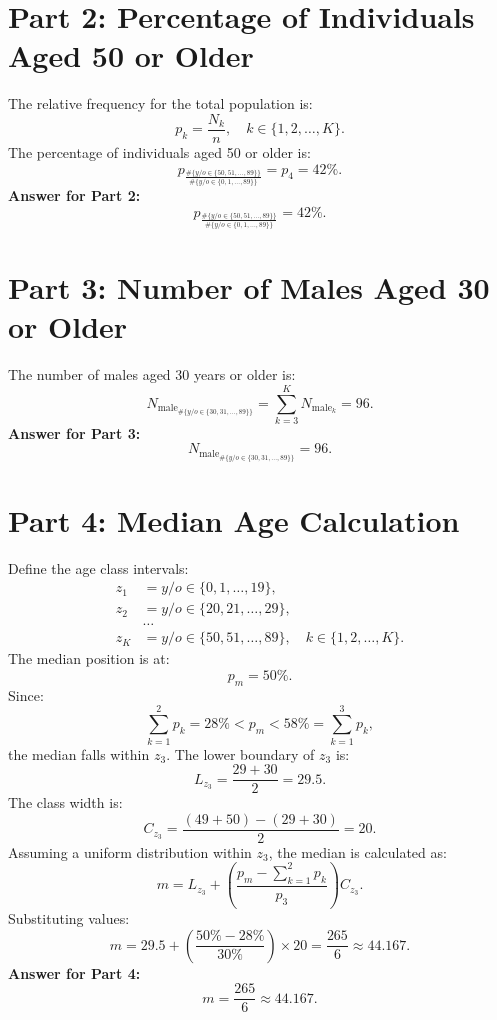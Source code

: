 \documentclass[12pt]{article}
\begin{document}
	\bigskip
	
	\section*{Part 2: Percentage of Individuals Aged 50 or Older}
	The relative frequency for the total population is:
	\[
	p_k = \frac{N_k}{n},\quad k \in \{1,2,\dots,K\}.
	\]
	The percentage of individuals aged 50 or older is:
	\[
	p_{\frac{\#\{y/o \in \{50,51,\dots,89\}\}}{\#\{y/o \in \{0,1,\dots,89\}\}}} = p_4 = 42\%.
	\]
	\textbf{Answer for Part 2:}
	\[
	\boxed{p_{\frac{\#\{y/o \in \{50,51,\dots,89\}\}}{\#\{y/o \in \{0,1,\dots,89\}\}}} = 42\%}.
	\]
	
	\bigskip
	
	\section*{Part 3: Number of Males Aged 30 or Older}
	The number of males aged 30 years or older is:
	\[
	N_{\mathrm{male}_{\#\{y/o \in \{30,31,\dots,89\}\}}} = \sum_{k=3}^{K} N_{\mathrm{male}_k} = 96.
	\]
	\textbf{Answer for Part 3:}
	\[
	\boxed{N_{\mathrm{male}_{\#\{y/o \in \{30,31,\dots,89\}\}}} = 96}.
	\]
	
	\bigskip
	
	\section*{Part 4: Median Age Calculation}
	Define the age class intervals:
	\[
	\begin{aligned}
		z_1 &= y/o \in \{0,1,\dots,19\}, \\
		z_2 &= y/o \in \{20,21,\dots,29\}, \\
		&\dots \\
		z_K &= y/o \in \{50,51,\dots,89\},\quad k \in \{1,2,\dots,K\}.
	\end{aligned}
	\]
	The median position is at:
	\[
	p_m = 50\%.
	\]
	Since:
	\[
	\sum_{k=1}^{2} p_k = 28\% < p_m < 58\% = \sum_{k=1}^{3} p_k,
	\]
	the median falls within $z_3$. The lower boundary of $z_3$ is:
	\[
	L_{z_3} = \frac{29+30}{2} = 29.5.
	\]
	The class width is:
	\[
	C_{z_3} = \frac{(49+50)-(29+30)}{2} = 20.
	\]
	Assuming a uniform distribution within $z_3$, the median is calculated as:
	\[
	m = L_{z_3} + \left(\frac{p_m - \sum_{k=1}^{2} p_k}{p_3}\right) C_{z_3}.
	\]
	Substituting values:
	\[
	m = 29.5 + \left(\frac{50\% - 28\%}{30\%}\right) \times 20 = \frac{265}{6} \approx 44.167.
	\]
	\textbf{Answer for Part 4:}
	\[
	\boxed{m = \frac{265}{6} \approx 44.167}.
	\]
	
\end{document}
